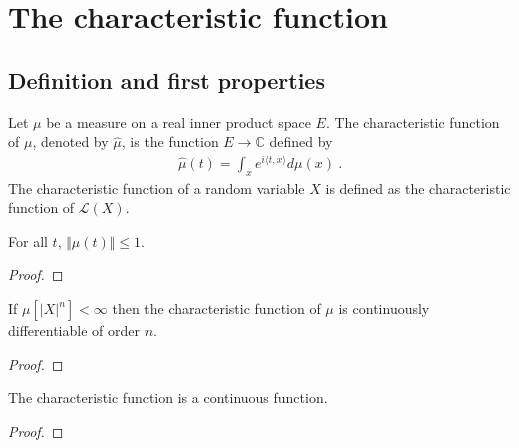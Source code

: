 \chapter{The characteristic function}

\section{Definition and first properties}

\begin{definition}\label{def:charFun}
 \mathlibok
Let $\mu$ be a measure on a real inner product space $E$. The characteristic function of $\mu$, denoted by $\hat{\mu}$, is the function $E \to \mathbb{C}$ defined by
\begin{align*}
\hat{\mu}(t) = \int_x e^{i \langle t, x \rangle} d\mu(x) \: .
\end{align*}
The characteristic function of a random variable $X$ is defined as the characteristic function of $\mathcal L(X)$.
\end{definition}


\begin{lemma}\label{lem:charFun_bounded}
 \mathlibok
{}
For all $t$, $\Vert\hat{\mu}(t)\Vert \le 1$.
\end{lemma}

\begin{proof}\leanok
\end{proof}


\begin{lemma}\label{lem:charFun_contDiff}
\leanok
{}
If $\mu[|X|^n] < \infty$ then the characteristic function of $\mu$ is continuously differentiable of order $n$.
\end{lemma}

\begin{proof}\leanok
\end{proof}


\begin{lemma}\label{lem:charFun_continuous}
\leanok
{}
The characteristic function is a continuous function.
\end{lemma}

\begin{proof}\leanok
{}
\end{proof}


